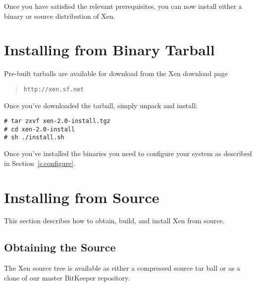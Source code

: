 Once you have satisfied the relevant prerequisites, you can now
install either a binary or source distribution of Xen.


\section{Installing from Binary Tarball}

Pre-built tarballs are available for download from the Xen download
page
\begin{quote} {\tt http://xen.sf.net}
\end{quote}

Once you've downloaded the tarball, simply unpack and install:
\begin{verbatim}
# tar zxvf xen-2.0-install.tgz
# cd xen-2.0-install
# sh ./install.sh
\end{verbatim}

Once you've installed the binaries you need to configure your system
as described in Section~\ref{s:configure}.


\section{Installing from Source}

This section describes how to obtain, build, and install Xen from
source.

\subsection{Obtaining the Source}

The Xen source tree is available as either a compressed source tar
ball or as a clone of our master BitKeeper repository.

